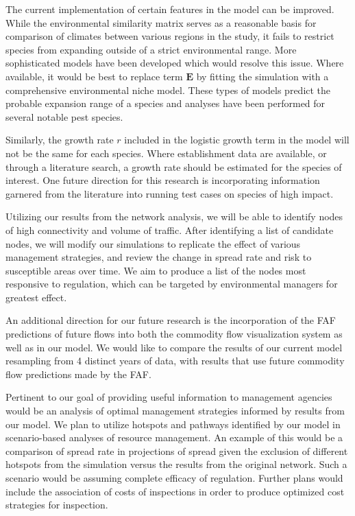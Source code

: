 \documentclass[12pt]{article}
\begin{document}
The current implementation of certain features in the model can be improved. While the environmental similarity matrix serves as a reasonable basis for comparison of climates between various regions in the study, it fails to restrict species from expanding outside of a strict environmental range. More sophisticated models have been developed which would resolve this issue. Where available, it would be best to replace term $\boldsymbol{E}$ by fitting the simulation with a comprehensive environmental niche model. These types of models predict the probable expansion range of a species and analyses have been performed for several notable pest species.

Similarly, the growth rate $r$ included in the logistic growth term in the model will not be the same for each species. Where establishment data are available, or through a literature search, a growth rate should be estimated for the species of interest. One future direction for this research is incorporating information garnered from the literature into running test cases on species of high impact.

Utilizing our results from the network analysis, we will be able to identify nodes of high connectivity and volume of traffic. After identifying a list of candidate nodes, we will modify our simulations to replicate the effect of various management strategies, and review the change in spread rate and risk to susceptible areas over time. We aim to produce a list of the nodes most responsive to regulation, which can be targeted by environmental managers for greatest effect.

An additional direction for our future research is the incorporation of the FAF predictions of future flows into both the commodity flow visualization system as well as in our model. We would like to compare the results of our current model resampling from 4 distinct years of data, with results that use future commodity flow predictions made by the FAF.

Pertinent to our goal of providing useful information to management agencies would be an analysis of optimal management strategies informed by results from our model. We plan to utilize hotspots and pathways identified by our model in scenario-based analyses of resource management. An example of this would be a comparison of spread rate in projections of spread given the exclusion of different hotspots from the simulation versus the results from the original network. Such a scenario would be assuming complete efficacy of regulation. Further plans would include the association of costs of inspections in order to produce optimized cost strategies for inspection.
\end{document}
